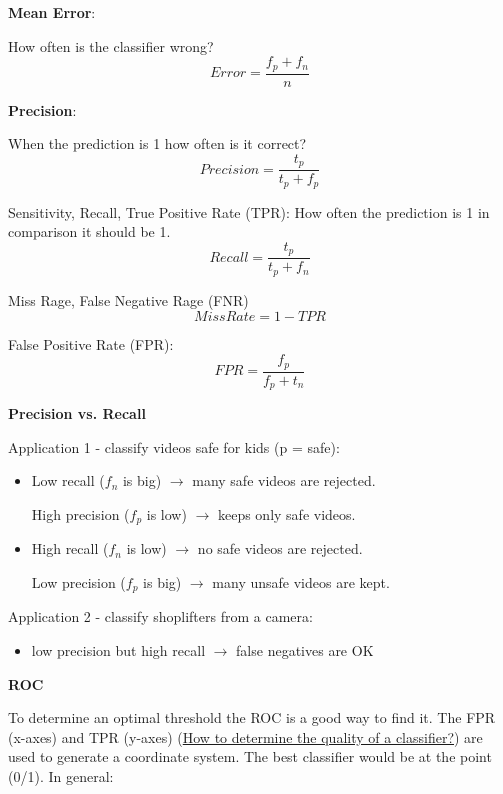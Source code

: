 \documentclass[11pt,twoside,landscape]{article}
\begin{document}
\begin{multicols}{3}
\textbf{Mean Error}:

How often is the classifier wrong?
\begin{equation}
Error = \frac{f_p + f_n}{n}
\end{equation}

\textbf{Precision}:

When the prediction is 1 how often is it correct?
\begin{equation}
Precision = \frac{t_p}{t_p + f_p}
\end{equation}

Sensitivity, Recall, True Positive Rate (TPR): How often the prediction is 1 in comparison it should be 1.
\begin{equation}
Recall = \frac{t_p}{t_p + f_n}
\end{equation}

Miss Rage, False Negative Rage (FNR)
\begin{equation}
Miss Rate = 1 - TPR
\end{equation}

False Positive Rate (FPR):
\begin{equation}
FPR = \frac{f_p}{f_p + t_n}
\end{equation}


\textbf{Precision vs. Recall}

Application 1 - classify videos safe for kids (p = safe):
\begin{itemize}
\item Low recall (\(f_n\) is big) \(\rightarrow\) many safe videos are rejected.

High precision (\(f_p\) is low) \(\rightarrow\) keeps only safe videos.

\item High recall (\(f_n\) is low) \(\rightarrow\) no safe videos are rejected.

Low precision (\(f_p\) is big) \(\rightarrow\) many unsafe videos are kept.
\end{itemize}


Application 2 - classify shoplifters from a camera:
\begin{itemize}
\item low precision but high recall \(\rightarrow\) false negatives are OK
\end{itemize}


\textbf{ROC}

To determine an optimal threshold the ROC is a good way to find it.
The FPR (x-axes) and TPR (y-axes) (\href{../../../roam/20211227105842-how_to_determine_the_quality_of_a_classifier.org}{How to determine the quality of a classifier?}) are used to generate a coordinate system. 
The best classifier would be at the point (0/1).
In general:


\end{multicols}
\end{document}
